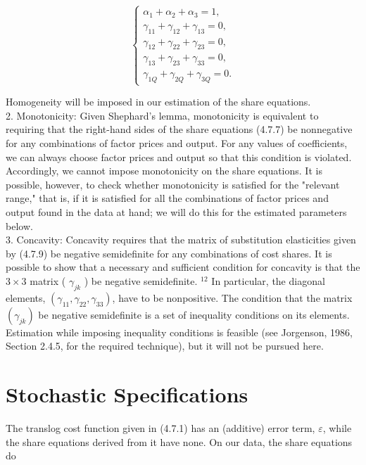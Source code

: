 \documentclass[10pt]{article}
\begin{document}
\[
\left\{\begin{array}{l}
\alpha_{1}+\alpha_{2}+\alpha_{3}=1,  \tag{4.7.10}\\
\gamma_{11}+\gamma_{12}+\gamma_{13}=0, \\
\gamma_{12}+\gamma_{22}+\gamma_{23}=0, \\
\gamma_{13}+\gamma_{23}+\gamma_{33}=0, \\
\gamma_{1 Q}+\gamma_{2 Q}+\gamma_{3 Q}=0 .
\end{array}\right.
\]

Homogeneity will be imposed in our estimation of the share equations.\\
2. Monotonicity: Given Shephard's lemma, monotonicity is equivalent to requiring that the right-hand sides of the share equations (4.7.7) be nonnegative for any combinations of factor prices and output. For any values of coefficients, we can always choose factor prices and output so that this condition is violated. Accordingly, we cannot impose monotonicity on the share equations. It is possible, however, to check whether monotonicity is satisfied for the "relevant range," that is, if it is satisfied for all the combinations of factor prices and output found in the data at hand; we will do this for the estimated parameters below.\\
3. Concavity: Concavity requires that the matrix of substitution elasticities given by (4.7.9) be negative semidefinite for any combinations of cost shares. It is possible to show that a necessary and sufficient condition for concavity is that the $3 \times 3$ matrix ( $\gamma_{j k}$ ) be negative semidefinite. ${ }^{12}$ In particular, the diagonal elements, $\left(\gamma_{11}, \gamma_{22}, \gamma_{33}\right)$, have to be nonpositive. The condition that the matrix $\left(\gamma_{j k}\right)$ be negative semidefinite is a set of inequality conditions on its elements. Estimation while imposing inequality conditions is feasible (see Jorgenson, 1986, Section 2.4.5, for the required technique), but it will not be pursued here.

\section*{Stochastic Specifications}
The translog cost function given in (4.7.1) has an (additive) error term, $\varepsilon$, while the share equations derived from it have none. On our data, the share equations do
\end{document}
